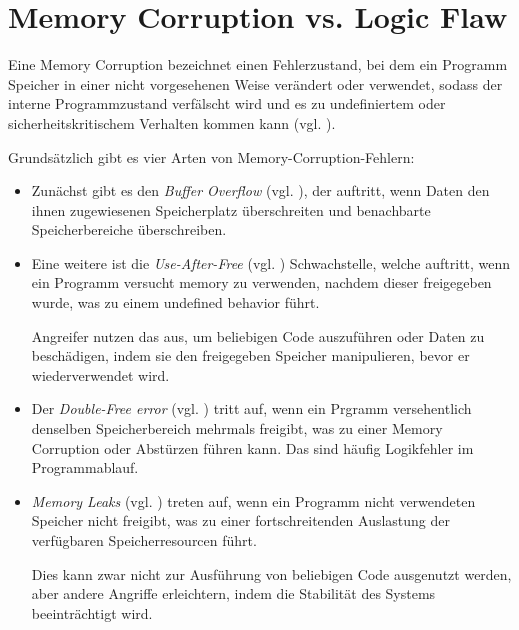 \documentclass[oneside,11pt,a4paper,article,german]{memoir}
\begin{document}
\section{Memory Corruption vs. Logic Flaw}

Eine Memory Corruption bezeichnet einen Fehlerzustand, bei dem ein Programm Speicher in einer nicht vorgesehenen Weise verändert oder verwendet,
sodass der interne Programmzustand verfälscht wird und es zu undefiniertem oder sicherheitskritischem Verhalten kommen kann
(vgl. \cite{c1_memory_corruption_stern, c2_memory_corruption_wikipedia}).

\par Grundsätzlich gibt es vier Arten von Memory-Corruption-Fehlern:
\begin{itemize}
    \item Zunächst gibt es den \textit{Buffer Overflow} (vgl. \cite{c1_memory_corruption_stern}), der auftritt, wenn Daten den ihnen zugewiesenen Speicherplatz
    überschreiten und benachbarte Speicherbereiche überschreiben.
    \item Eine weitere ist die \textit{Use-After-Free} (vgl. \cite{c1_memory_corruption_stern}) Schwachstelle, welche auftritt, wenn ein Programm versucht
    memory zu verwenden, nachdem dieser freigegeben wurde, was zu einem undefined behavior führt.
    \par Angreifer nutzen das aus, um beliebigen Code auszuführen oder Daten zu beschädigen, indem sie den freigegeben Speicher manipulieren, bevor er
    wiederverwendet wird.
    \item Der \textit{Double-Free error} (vgl. \cite{c1_memory_corruption_stern}) tritt auf, wenn ein Prgramm versehentlich denselben Speicherbereich mehrmals freigibt,
    was zu einer Memory Corruption oder Abstürzen führen kann. Das sind häufig Logikfehler im Programmablauf.
    \item \textit{Memory Leaks} (vgl. \cite{c1_memory_corruption_stern}) treten auf, wenn ein Programm nicht verwendeten Speicher nicht freigibt, was zu einer
    fortschreitenden Auslastung der verfügbaren Speicherresourcen führt.
    \par Dies kann zwar nicht zur Ausführung von beliebigen Code ausgenutzt werden, aber andere Angriffe erleichtern, indem die Stabilität
    des Systems beeinträchtigt wird.

\end{itemize}
\end{document}
